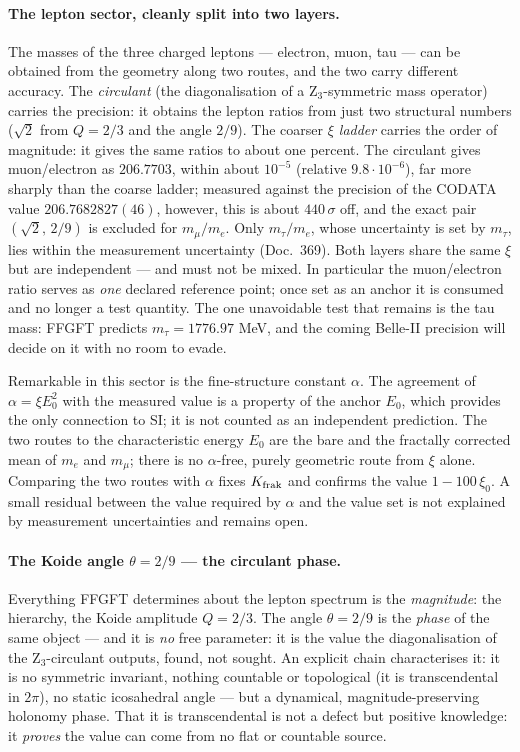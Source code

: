 \paragraph{The lepton sector, cleanly split into two layers.} The masses
of the three charged leptons --- electron, muon, tau --- can be obtained
from the geometry along two routes, and the two carry different accuracy.
The \emph{circulant} (the diagonalisation of a Z$_3$-symmetric mass
operator) carries the precision: it obtains the lepton ratios from just
two structural numbers ($\sqrt2$ from $Q=2/3$ and the angle $2/9$). The
coarser \emph{$\xi$ ladder} carries the order of magnitude: it gives the
same ratios to about one percent. The circulant gives muon/electron as
$206.7703$, within about $10^{-5}$ (relative $9.8\cdot10^{-6}$), far more
sharply than the coarse ladder; measured against the precision of the
CODATA value $206.7682827(46)$, however, this is about $440\,\sigma$ off,
and the exact pair $(\sqrt2,\,2/9)$ is excluded for $m_\mu/m_e$. Only
$m_\tau/m_e$, whose uncertainty is set by $m_\tau$, lies within the
measurement uncertainty (Doc.~369). Both layers share the same $\xi$ but are independent --- and must not be mixed. In
particular the muon/electron ratio serves as \emph{one} declared reference
point; once set as an anchor it is consumed and no longer a test quantity.
The one unavoidable test that remains is the tau mass: FFGFT predicts
$m_\tau = 1776.97$ MeV, and the coming Belle-II precision will decide on
it with no room to evade.

Remarkable in this sector is the fine-structure constant $\alpha$. The
agreement of $\alpha = \xi E_0^2$ with the measured value is a property of
the anchor $E_0$, which provides the only connection to SI; it is not
counted as an independent prediction. The two routes to the
characteristic energy $E_0$ are the bare and the fractally corrected mean
of $m_e$ and $m_\mu$; there is no $\alpha$-free, purely geometric route
from $\xi$ alone. Comparing the two routes with $\alpha$ fixes
$K_{\rm frak}$ and confirms the value $1-100\,\xi_0$. A small residual
between the value required by $\alpha$ and the value set is not explained
by measurement uncertainties and remains open.

\paragraph{The Koide angle $\theta = 2/9$ --- the circulant phase.} Everything FFGFT determines about the lepton spectrum is the
\emph{magnitude}: the hierarchy, the Koide amplitude $Q = 2/3$. The angle $\theta = 2/9$ is the \emph{phase} of the same object --- and it is
\emph{no} free parameter: it is the value the diagonalisation of the
Z$_3$-circulant outputs, found, not sought. An explicit chain characterises it: it is no symmetric invariant, nothing
countable or topological (it is transcendental in $2\pi$), no static
icosahedral angle --- but a dynamical, magnitude-preserving holonomy phase.
That it is transcendental is not a defect but positive knowledge: it
\emph{proves} the value can come from no flat or countable source.

